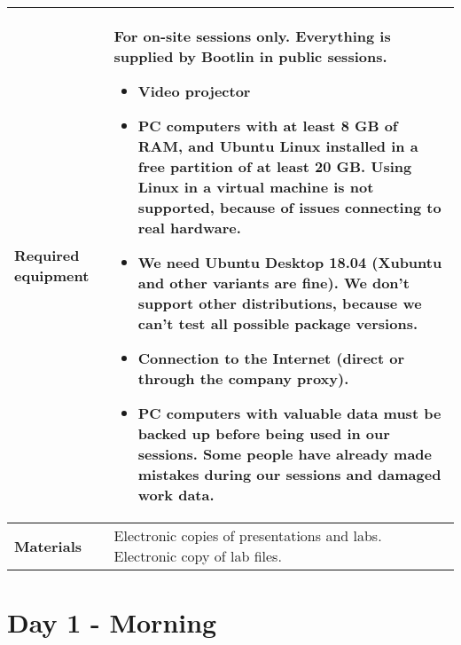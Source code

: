 \documentclass[a4paper,12pt,obeyspaces,spaces,hyphens]{article}
\begin{document}
{  \begin{tabularx}{\textwidth}{|g|h|}
    {\bf Required equipment} &
    {\bf For on-site sessions only.}
    \newline Everything is supplied by Bootlin in public
    sessions.
    \begin{itemize}
    \item Video projector
    \item PC computers with at least 8 GB of RAM, and Ubuntu Linux
    installed in a {\bf free partition of at least 20 GB. Using Linux
      in a virtual machine is not supported}, because of issues
    connecting to real hardware.
    \item We need Ubuntu Desktop 18.04 (Xubuntu and other variants
    are fine). We don't support other distributions, because we can't
    test all possible package versions.
    \item {\bf Connection to the Internet} (direct or through the
    company proxy).
    \item {\bf PC computers with valuable data must be backed up}
    before being used in our sessions.  Some people have already made
    mistakes during our sessions and damaged work data.
    \end{itemize}\\
    \hline

    {\bf Materials} & Electronic copies of presentations and
    labs.
    \newline Electronic copy of lab files.\\
    \hline

\end{tabularx}}

\newpage

\normalsize

\section{Day 1 - Morning}
\end{document}
